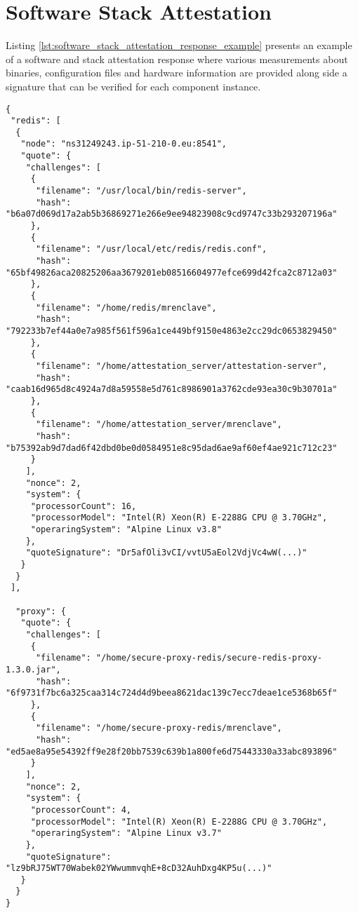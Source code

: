 \chapter{Software Stack Attestation}
\label{ann:software_stack_attestation_response_example}

Listing \ref{lst:software_stack_attestation_response_example} presents an example of a software and stack attestation response where various measurements about binaries, configuration files and hardware information are provided along side a signature that can be verified for each component instance.

\begin{lstlisting}
{
 "redis": [
  {
   "node": "ns31249243.ip-51-210-0.eu:8541",
   "quote": {
    "challenges": [
     {
      "filename": "/usr/local/bin/redis-server",
      "hash": "b6a07d069d17a2ab5b36869271e266e9ee94823908c9cd9747c33b293207196a"
     },
     {
      "filename": "/usr/local/etc/redis/redis.conf",
      "hash": "65bf49826aca20825206aa3679201eb08516604977efce699d42fca2c8712a03"
     },
     {
      "filename": "/home/redis/mrenclave",
      "hash": "792233b7ef44a0e7a985f561f596a1ce449bf9150e4863e2cc29dc0653829450"
     },
     {
      "filename": "/home/attestation_server/attestation-server",
      "hash": "caab16d965d8c4924a7d8a59558e5d761c8986901a3762cde93ea30c9b30701a"
     },
     {
      "filename": "/home/attestation_server/mrenclave",
      "hash": "b75392ab9d7dad6f42dbd0be0d0584951e8c95dad6ae9af60ef4ae921c712c23"
     }
    ],
    "nonce": 2,
    "system": {
     "processorCount": 16,
     "processorModel": "Intel(R) Xeon(R) E-2288G CPU @ 3.70GHz",
     "operaringSystem": "Alpine Linux v3.8"
    },
    "quoteSignature": "Dr5afOli3vCI/vvtU5aEol2VdjVc4wW(...)"
   }
  }
 ],
    
  "proxy": {
   "quote": {
    "challenges": [
     {
      "filename": "/home/secure-proxy-redis/secure-redis-proxy-1.3.0.jar",
      "hash": "6f9731f7bc6a325caa314c724d4d9beea8621dac139c7ecc7deae1ce5368b65f"
     },
     {
      "filename": "/home/secure-proxy-redis/mrenclave",
      "hash": "ed5ae8a95e54392ff9e28f20bb7539c639b1a800fe6d75443330a33abc893896"
     }
    ],
    "nonce": 2,
    "system": {
     "processorCount": 4,
     "processorModel": "Intel(R) Xeon(R) E-2288G CPU @ 3.70GHz",
     "operaringSystem": "Alpine Linux v3.7"
    },
    "quoteSignature": "lz9bRJ75WT70Wabek02YWwummvqhE+8cD32AuhDxg4KP5u(...)"
   }
  }
}
\end{lstlisting}
